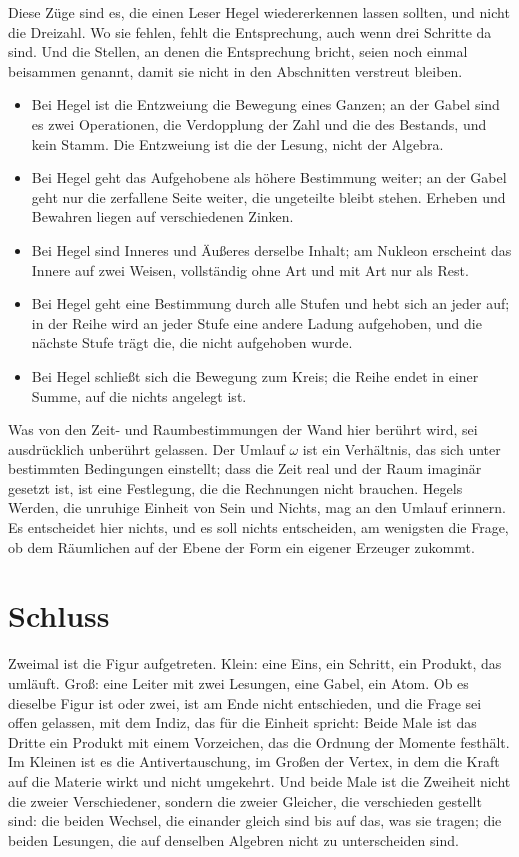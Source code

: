 \documentclass[11pt,a4paper]{article}
\begin{document}
Diese Züge sind es, die einen Leser Hegel wiedererkennen lassen sollten, und nicht die Dreizahl. Wo sie fehlen, fehlt die Entsprechung, auch wenn drei Schritte da sind. Und die Stellen, an denen die Entsprechung bricht, seien noch einmal beisammen genannt, damit sie nicht in den Abschnitten verstreut bleiben.

\begin{itemize}[leftmargin=1.6em,itemsep=2pt]
\item Bei Hegel ist die Entzweiung die Bewegung eines Ganzen; an der Gabel sind es zwei Operationen, die Verdopplung der Zahl und die des Bestands, und kein Stamm. Die Entzweiung ist die der Lesung, nicht der Algebra.
\item Bei Hegel geht das Aufgehobene als höhere Bestimmung weiter; an der Gabel geht nur die zerfallene Seite weiter, die ungeteilte bleibt stehen. Erheben und Bewahren liegen auf verschiedenen Zinken.
\item Bei Hegel sind Inneres und Äußeres derselbe Inhalt; am Nukleon erscheint das Innere auf zwei Weisen, vollständig ohne Art und mit Art nur als Rest.
\item Bei Hegel geht eine Bestimmung durch alle Stufen und hebt sich an jeder auf; in der Reihe wird an jeder Stufe eine andere Ladung aufgehoben, und die nächste Stufe trägt die, die nicht aufgehoben wurde.
\item Bei Hegel schließt sich die Bewegung zum Kreis; die Reihe endet in einer Summe, auf die nichts angelegt ist.
\end{itemize}

Was von den Zeit- und Raumbestimmungen der Wand hier berührt wird, sei ausdrücklich unberührt gelassen. Der Umlauf $\omega$ ist ein Verhältnis, das sich unter bestimmten Bedingungen einstellt; dass die Zeit real und der Raum imaginär gesetzt ist, ist eine Festlegung, die die Rechnungen nicht brauchen. Hegels Werden, die unruhige Einheit von Sein und Nichts, mag an den Umlauf erinnern. Es entscheidet hier nichts, und es soll nichts entscheiden, am wenigsten die Frage, ob dem Räumlichen auf der Ebene der Form ein eigener Erzeuger zukommt.

\section*{Schluss}

Zweimal ist die Figur aufgetreten. Klein: eine Eins, ein Schritt, ein Produkt, das umläuft. Groß: eine Leiter mit zwei Lesungen, eine Gabel, ein Atom. Ob es dieselbe Figur ist oder zwei, ist am Ende nicht entschieden, und die Frage sei offen gelassen, mit dem Indiz, das für die Einheit spricht: Beide Male ist das Dritte ein Produkt mit einem Vorzeichen, das die Ordnung der Momente festhält. Im Kleinen ist es die Antivertauschung, im Großen der Vertex, in dem die Kraft auf die Materie wirkt und nicht umgekehrt. Und beide Male ist die Zweiheit nicht die zweier Verschiedener, sondern die zweier Gleicher, die verschieden gestellt sind: die beiden Wechsel, die einander gleich sind bis auf das, was sie tragen; die beiden Lesungen, die auf denselben Algebren nicht zu unterscheiden sind.
\end{document}
